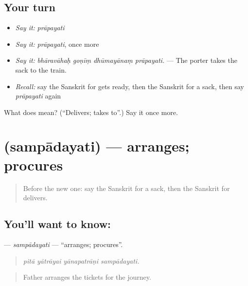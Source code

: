 \subsection*{Your turn}
\begin{itemize}
\raggedright
  \item \emph{Say it:} \emph{prāpayati}
  \item \emph{Say it:} \emph{prāpayati}, once more
  \item \emph{Say it:} \emph{bhāravāhaḥ goṇīṃ dhūmayānaṃ prāpayati.} — The porter takes the sack to the train.
  \item \emph{Recall:} say the Sanskrit for gets ready, then the Sanskrit for a sack, then say \emph{prāpayati} again
\end{itemize}

\begin{tcolorbox}[breakable,colback=teal!4,colframe=teal!35!black,title={Before you move on}]
What does  mean? (\textquotedblleft{}Delivers; takes to\textquotedblright{}.) Say it once more.
\end{tcolorbox}
\section[\texorpdfstring{\sk{सम्पादयति} (sampādayati)}{सम्पादयति (sampādayati)}]{ (sampādayati) — arranges; procures}

\label{lesson:SA-C413-sampadayati}



\begin{quote}
Before the new one: say the Sanskrit for a sack, then the Sanskrit for delivers.
\end{quote}

\subsection*{You'll want to know: }
\textbf{} — \emph{sampādayati} — \textquotedblleft{}arranges; procures\textquotedblright{}.

\begin{quote}
   
\end{quote}

\begin{quote}
\emph{pitā yātrāyai yānapatrāṇi sampādayati.}
\end{quote}

\begin{quote}
Father arranges the tickets for the journey.
\end{quote}

